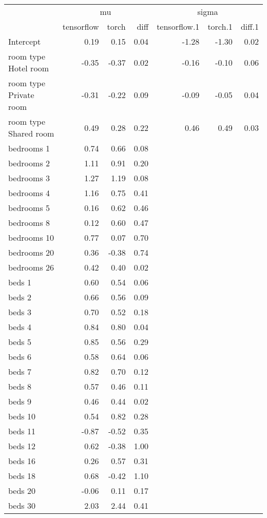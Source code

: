 
\begin{tabular}[t]{lrrrrrr}
\toprule
\multicolumn{1}{c}{ } & \multicolumn{3}{c}{mu} & \multicolumn{3}{c}{sigma} \\
\cmidrule(l{3pt}r{3pt}){2-4} \cmidrule(l{3pt}r{3pt}){5-7}
  & tensorflow & torch & diff & tensorflow.1 & torch.1 & diff.1\\
\midrule
Intercept & 0.19 & 0.15 & 0.04 & -1.28 & -1.30 & 0.02\\
room type Hotel room & -0.35 & -0.37 & 0.02 & -0.16 & -0.10 & 0.06\\
room type Private room & -0.31 & -0.22 & 0.09 & -0.09 & -0.05 & 0.04\\
room type Shared room & 0.49 & 0.28 & 0.22 & 0.46 & 0.49 & 0.03\\
bedrooms 1 & 0.74 & 0.66 & 0.08 &  &  & \\
\addlinespace
bedrooms 2 & 1.11 & 0.91 & 0.20 &  &  & \\
bedrooms 3 & 1.27 & 1.19 & 0.08 &  &  & \\
bedrooms 4 & 1.16 & 0.75 & 0.41 &  &  & \\
bedrooms 5 & 0.16 & 0.62 & 0.46 &  &  & \\
bedrooms 8 & 0.12 & 0.60 & 0.47 &  &  & \\
\addlinespace
bedrooms 10 & 0.77 & 0.07 & 0.70 &  &  & \\
bedrooms 20 & 0.36 & -0.38 & 0.74 &  &  & \\
bedrooms 26 & 0.42 & 0.40 & 0.02 &  &  & \\
beds 1 & 0.60 & 0.54 & 0.06 &  &  & \\
beds 2 & 0.66 & 0.56 & 0.09 &  &  & \\
\addlinespace
beds 3 & 0.70 & 0.52 & 0.18 &  &  & \\
beds 4 & 0.84 & 0.80 & 0.04 &  &  & \\
beds 5 & 0.85 & 0.56 & 0.29 &  &  & \\
beds 6 & 0.58 & 0.64 & 0.06 &  &  & \\
beds 7 & 0.82 & 0.70 & 0.12 &  &  & \\
\addlinespace
beds 8 & 0.57 & 0.46 & 0.11 &  &  & \\
beds 9 & 0.46 & 0.44 & 0.02 &  &  & \\
beds 10 & 0.54 & 0.82 & 0.28 &  &  & \\
beds 11 & -0.87 & -0.52 & 0.35 &  &  & \\
beds 12 & 0.62 & -0.38 & 1.00 &  &  & \\
\addlinespace
beds 16 & 0.26 & 0.57 & 0.31 &  &  & \\
beds 18 & 0.68 & -0.42 & 1.10 &  &  & \\
beds 20 & -0.06 & 0.11 & 0.17 &  &  & \\
beds 30 & 2.03 & 2.44 & 0.41 &  &  & \\
\bottomrule
\end{tabular}
